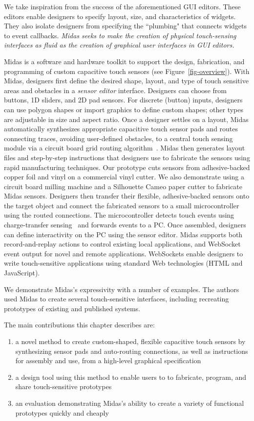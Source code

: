 We take inspiration from the success of the aforementioned GUI editors. These editors enable designers to specify layout, size, and characteristics of widgets. They also isolate designers from specifying the ``plumbing" that connects widgets to event callbacks. {\em Midas seeks to make the creation of physical touch-sensing interfaces as fluid as the creation of graphical user interfaces in GUI editors.}

Midas is a software and hardware toolkit to support the design, fabrication, and programming of custom capacitive touch sensors (see Figure~\ref{fig-overview}). With Midas, designers first define the desired shape, layout, and type of touch sensitive areas and obstacles in a {\em sensor editor} interface. Designers can choose from buttons, 1D sliders, and 2D pad sensors. For discrete (button) inputs, designers can use polygon shapes or import graphics to define custom shapes; other types are adjustable in size and aspect ratio. Once a designer settles on a layout, Midas automatically synthesizes appropriate capacitive touch sensor pads and routes connecting traces, avoiding user-defined obstacles, to a central touch sensing module via a circuit board grid routing algorithm~\cite{lee-maze}. Midas then generates layout files and step-by-step instructions that designers use to fabricate the sensors using rapid manufacturing techniques. Our prototype cuts sensors from adhesive-backed copper foil and vinyl on a commercial vinyl cutter.  We also demonstrate using a circuit board milling machine and a Silhouette Cameo paper cutter to fabricate Midas sensors. Designers then transfer their flexible, adhesive-backed sensors onto the target object and connect the fabricated sensors to a small microcontroller using the routed connections. The microcontroller detects touch events using charge-transfer sensing~\cite{philipp-chargetransfer} and forwards events to a PC. Once assembled, designers can define interactivity on the PC using the sensor editor. Midas supports both record-and-replay actions to control existing local applications, and WebSocket event output for novel and remote applications. WebSockets enable designers to write touch-sensitive applications using standard Web technologies (HTML and JavaScript).

We demonstrate Midas's expressivity with a number of examples. The authors used Midas to create several touch-sensitive interfaces, including recreating prototypes of existing and published systems.

The main contributions this chapter describes are: \begin{enumerate}
\item a novel method to create custom-shaped, flexible capacitive touch sensors by synthesizing sensor pads and auto-routing connections, as well as instructions for assembly and use, from a high-level graphical specification
\item a design tool using this method to enable users to to fabricate, program, and share touch-sensitive prototypes
\item an evaluation demonstrating Midas's ability to create a variety of functional prototypes quickly and cheaply
\end{enumerate}

